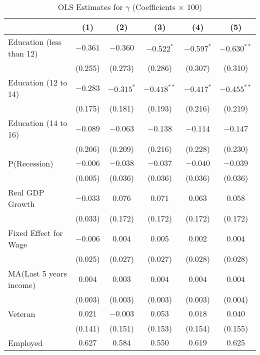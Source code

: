 \documentclass[12pt]{article}
\begin{document}
\begin{table}[H]
\centering
\caption{OLS Estimates for $\gamma$ (Coefficients $\times$ 100)}

\begin{tabular}{lccccc}

\toprule
                    & (1)     & (2)   & (3)    & (4)      & (5)         \\
\midrule
Education (less than 12)                & $-0.361$  & $-0.360$    & $-0.522^{*}$  & $-0.597^{*}$   & $-0.630^{**}$    \\
                    & (0.255)   & (0.273)     & (0.286)   & (0.307)    & (0.310)     \\
Education (12 to 14)                & $-0.283$  & $-0.315^{*}$    & $-0.418^{**}$  & $-0.417^{*}$   & $-0.455^{**}$    \\
                    & (0.175)   & (0.181)     & (0.193)   & (0.216)    & (0.219)     \\
Education (14 to 16)                & $-0.089$  & $-0.063$    & $-0.138$  & $-0.114$   & $-0.147$    \\
                    & (0.206)   & (0.209)     & (0.216)   & (0.228)    & (0.230)     \\
P(Recession)            & $-0.006$   & $-0.038$     & $-0.037$   & $-0.040$    & $-0.039$     \\
                    & (0.005)   & (0.036)     & (0.036)   & (0.036)    & (0.036)     \\
Real GDP Growth            & $-0.033$   & $0.076$     & $0.071$   & $0.063$    & $0.058$     \\
                    & (0.033)   & (0.172)     & (0.172)   & (0.172)    & (0.172)     \\
Fixed Effect for Wage         & $-0.006$   & $0.004$     & $0.005$   & $0.002$    & $0.004$     \\
                    & (0.025)   & (0.027)     & (0.027)   & (0.028)    & (0.028)     \\
MA(Last 5 years income)              & $0.004$   & $0.003$     & $0.004$   & $0.004$    & $0.004$     \\
                    & (0.003)   & (0.003)     & (0.003)   & (0.003)    & (0.004)     \\
Veteran             & $0.021$   & $-0.003$     & $0.053$   & $0.018$    & $0.040$     \\
                    & (0.141)   & (0.151)     & (0.153)   & (0.154)    & (0.155)     \\
Employed                 & $0.627$   & $0.584$     & $0.550$   & $0.619$    & $0.625$     \\

\end{tabular}
\end{table}
\end{document}
